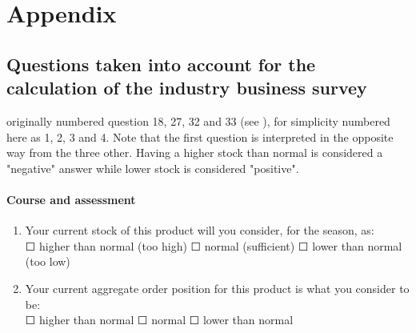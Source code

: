 \documentclass[12pt,a4paper,oneside]{book}
\begin{document}
\nocite{binder_business_1995}
\nocite{dresse_survey_2008}
\nocite{lemasson_enquete_2017}
\nocite{mevik_uncertainty_2004}



 


\appendix  

  \listoffigures
  \listoftables


\chapter{Appendix}


\section{Questions taken into account for the calculation of the industry business survey}
\label{Appendix: Question NS975 description}

originally numbered question 18, 27, 32 and 33 (see ), for simplicity numbered here as 1, 2, 3 and 4.
Note that the first question is interpreted in the opposite way from the three other. Having a higher stock than normal is considered a "negative" answer while lower stock is considered "positive".


\subsubsection*{Course and assessment}
\begin{enumerate}
    \item Your current stock of this product will you consider, for the season, as: \\
    $\Square$ higher than normal (too high) $\Square$ normal (sufficient) $\Square$ lower than normal (too low)
    
    \item Your current aggregate order position for this product is what you consider to be: \\
    $\Square$ higher than normal $\Square$ normal $\Square$ lower than normal
\end{enumerate}
\end{document}
